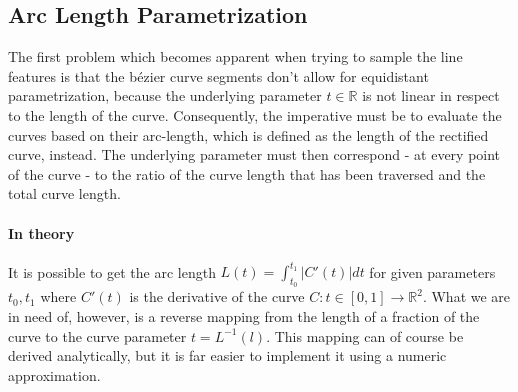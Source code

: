 \subsection{Arc Length Parametrization}
The first problem which becomes apparent when trying to sample the line features is that the b\'{e}zier curve segments don't allow for equidistant parametrization, because the underlying parameter $t \in \mathbb{R}$ is not linear in respect to the length of the curve. Consequently, the imperative must be to evaluate the curves based on their arc-length, which is defined as the length of the rectified curve, instead. The underlying parameter must then correspond - at every point of the curve - to the ratio of the curve length
that has been traversed and the total curve length.

\paragraph{In theory}
It is possible to get the arc length $L(t)=\int_{t_{0}}^{t_{1}} \left|C'(t)\right| dt$ for given parameters $t_{0}, t_{1}$ where $C'(t)$ is the derivative of the curve $C:t \in [0,1] \rightarrow \mathbb{R}^2$. What we are in need of, however, is a reverse mapping from the length of a fraction of the curve to the curve parameter $t = L^{-1}(l)$. 
This mapping can of course be derived analytically, but it is far easier to implement it using a numeric approximation. 

